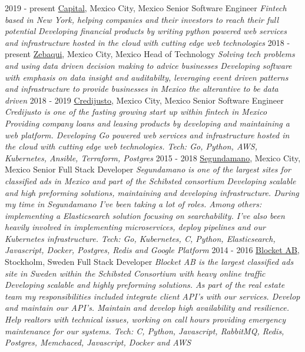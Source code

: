 \documentclass[]{friggeri-cv}
\begin{document}
\begin{entrylist}
  \bigentry
    {2019 - present}
    {{\href{https://www.captec.io/}{Capital}}, Mexico City, Mexico} {Senior Software Engineer}
    {\emph{Fintech based in New York, helping companies and their investors to reach their full potential}}
    {\textit{Developing financial products by writing python powered web services and infrastructure hosted in the cloud with cutting edge web technologies}\newline }
  \bigentry
    {2018 - present}
    {{\href{https://www.zebaqui.com/}{Zebaqui}}, Mexico City, Mexico} {Head of Technology}
    {\emph{Solving tech problems and using data driven decision making to advice businesses}}
    {\textit{Developing software with emphasis on data insight and auditabilty, leveraging event driven patterns and infrastructure to provide businesses in Mexico the alterantive to be data driven}\newline }
  \bigentry
    {2018 - 2019}
    {{\href{https://www.credijusto.com/}{Credijusto}}, Mexico City, Mexico} {Senior Software Engineer}
    {\emph{Credijusto is one of the fasting growing start up within fintech in Mexico}}
    {\textit{Providing company loans and leasing products by developing and maintaining a web platform. Developing Go powered web services and infrastructure hosted in the cloud with cutting edge web technologies. Tech: Go, Python, AWS, Kubernetes, Ansible, Terraform, Postgres}\newline }
  \bigentry
    {2015 - 2018}
    {{\href{https://www.segundamano.com.mx/}{Segundamano}}, Mexico City, Mexico} {Senior Full Stack Developer}
    {\emph{Segundamano is one of the largest sites for classified ads in Mexico and part of the Schibsted consortium}}
    {\textit{Developing scalable and high preforming solutions, maintaining and developing infrastructure. During my time in Segundamano I've been taking a lot of roles. Among others: implementing a Elasticsearch solution focusing on searchability. I've also been heavily involved in implementing microservices, deploy pipelines and our Kubernetes infrastructure. Tech: Go, Kubernetes, C, Python, Elasticsearch, Javascript, Docker, Postgres, Redis and Google Platform}\newline}
  \bigentry
    {2014 - 2016}
    {{\href{http://blocket.se}{Blocket AB}}, Stockholm, Sweden} {Full Stack Developer}
    {\emph{Blocket AB is the largest classified ads site in Sweden within the Schibsted Consortium with heavy online traffic}}
    {\textit{Developing scalable and highly preforming solutions. As part of the real estate team my responsibilities included integrate client API's with our services. Develop and maintain our API's. Maintain and develop high availability and resilience. Help realtors with technical issues, working on call hours providing emergency maintenance for our systems. Tech: C, Python, Javascript, RabbitMQ, Redis, Postgres, Memchaced, Javascript, Docker and AWS}\newline}
\end{entrylist}
\end{document}
